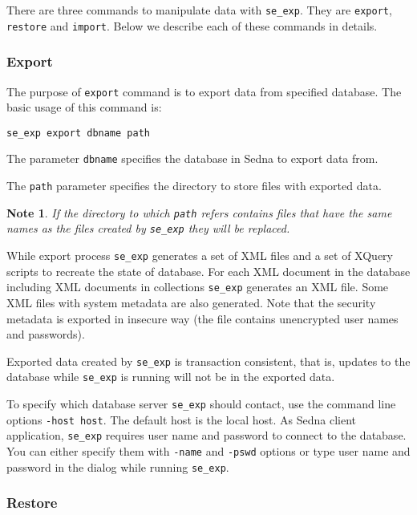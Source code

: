 \documentclass[a4paper,12pt]{article}
\newtheorem{note}{Note}    %
\begin{document}
There are three commands to manipulate data with \verb!se_exp!. They are
\verb!export!, \verb!restore! and \verb!import!. Below we describe each of these
commands in details.


\subsubsection*{Export}

The purpose of \verb!export! command is to export data from specified database.
The basic usage of this command is:

\begin{verbatim}
se_exp export dbname path
\end{verbatim}

The parameter \verb!dbname! specifies the database in Sedna to export data from.

The \verb!path! parameter specifies the directory to store files with exported
data.

\begin{note} 
If the directory to which \verb!path! refers contains files that have the same
names as the files created by \verb!se_exp! they will be replaced.
\end{note}

While export process \verb!se_exp! generates a set of XML files and a set of
XQuery scripts to recreate the state of database. For each XML document in the
database including XML documents in collections \verb!se_exp! generates an XML
file. Some XML files with system metadata are also generated. Note that the
security metadata is exported in insecure way (the file contains unencrypted
user names and passwords).

Exported data created by \verb!se_exp! is transaction consistent, that is,
updates to the database while \verb!se_exp! is running will not be in the
exported data.

To specify which database server \verb!se_exp! should contact, use the command
line options \verb!-host host!. The default host is the local host. As Sedna
client application, \verb!se_exp! requires user name and password to connect to
the database. You can either specify them with \verb!-name! and \verb!-pswd!
options or type user name and password in the dialog while running
\verb!se_exp!.


\subsubsection*{Restore}
\end{document}
